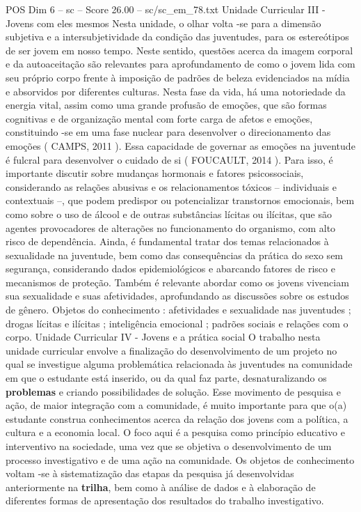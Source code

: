 \begin{textsample}{POS Dim 6 – sc – Score 26.00 – sc/sc\_em\_78.txt}
Unidade Curricular III - Jovens com eles mesmos Nesta unidade, o olhar volta -se para a dimensão subjetiva e a intersubjetividade da condição das juventudes, para os estereótipos de ser jovem em nosso tempo.
Neste sentido, questões acerca da imagem corporal e da autoaceitação são relevantes para aprofundamento de como o jovem lida com seu próprio corpo frente à imposição de padrões de beleza evidenciados na mídia e absorvidos por diferentes culturas.
Nesta fase da vida, há uma notoriedade da energia vital, assim como uma grande profusão de emoções, que são formas cognitivas e de organização mental com forte carga de afetos e emoções, constituindo -se em uma fase nuclear para desenvolver o direcionamento das emoções ( CAMPS, 2011 ).
Essa capacidade de governar as emoções na juventude é fulcral para desenvolver o cuidado de si ( FOUCAULT, 2014 ).
Para isso, é importante discutir sobre mudanças hormonais e fatores psicossociais, considerando as relações abusivas e os relacionamentos tóxicos – individuais e contextuais –, que podem predispor ou potencializar transtornos emocionais, bem como sobre o uso de álcool e de outras substâncias lícitas ou ilícitas, que são agentes provocadores de alterações no funcionamento do organismo, com alto risco de dependência.
Ainda, é fundamental tratar dos temas relacionados à sexualidade na juventude, bem como das consequências da prática do sexo sem segurança, considerando dados epidemiológicos e abarcando fatores de risco e mecanismos de proteção.
Também é relevante abordar como os jovens vivenciam sua sexualidade e suas afetividades, aprofundando as discussões sobre os estudos de gênero.
Objetos do conhecimento : afetividades e sexualidade nas juventudes ; drogas lícitas e ilícitas ; inteligência emocional ; padrões sociais e relações com o corpo.
Unidade Curricular IV - Jovens e a prática social O trabalho nesta unidade curricular envolve a finalização do desenvolvimento de um projeto no qual se investigue alguma problemática relacionada às juventudes na comunidade em que o estudante está inserido, ou da qual faz parte, desnaturalizando os \textbf{problemas} e criando possibilidades de solução.
Esse movimento de pesquisa e ação, de maior integração com a comunidade, é muito importante para que o(a) estudante construa conhecimentos acerca da relação dos jovens com a política, a cultura e a economia local.
O foco aqui é a pesquisa como princípio educativo e interventivo na sociedade, uma vez que se objetiva o desenvolvimento de um processo investigativo e de uma ação na comunidade.
Os objetos de conhecimento voltam -se à sistematização das etapas da pesquisa já desenvolvidas anteriormente na \textbf{trilha}, bem como à análise de dados e à elaboração de diferentes formas de apresentação dos resultados do trabalho investigativo.

\end{textsample}
